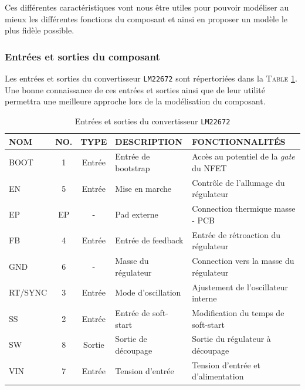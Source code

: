 			Ces différentes caractéristiques vont nous être utiles pour pouvoir 
			modéliser au mieux les différentes fonctions du composant et ainsi
			en proposer un modèle le plus fidèle possible.
		 
			\subsubsection{Entrées et sorties du composant}
			
			Les entrées et sorties du convertisseur \texttt{LM22672} sont répertoriées dans la
			\textsc{Table \ref{io_lm22672}}. 
			Une bonne connaissance de ces entrées et sorties ainsi que de leur 
			utilité permettra une meilleure approche lors de la modélisation 
			du composant.
			
			\begin{table}[h]
				\begin{center}
					\begin{tabular}{|l|c|c|l|l|}
					\hline
					\textbf{NOM}	& \textbf{NO.}	& \textbf{TYPE}	& \textbf{DESCRIPTION}	& \textbf{FONCTIONNALITÉS} \\
					\hline										
					BOOT			&	1			& 	Entrée		& 	Entrée de bootstrap	&	Accès au 
																								potentiel de la 
																								\textit{gate} du NFET	\\
					EN				&	5			&	Entrée		& 	Mise en marche		& 	Contrôle de
																								l'allumage du régulateur\\
					EP				& 	EP			&	-			&	Pad externe			& 	Connection thermique 
																								masse - PCB 			\\
					FB				&	4			&	Entrée		&	Entrée de feedback	&	Entrée de rétroaction
																								du régulateur			\\
					GND				&	6			&	-			&	Masse du régulateur	&	Connection vers la masse 
																								du régulateur			\\
					RT/SYNC			&	3			&	Entrée		&	Mode d'oscillation	&	Ajustement de
																								l'oscillateur interne	\\
					SS				&	2			&	Entrée		&	Entrée de soft-start&	Modification du temps
																								de soft-start			\\
					SW				&	8			&	Sortie		&	Sortie de découpage	&	Sortie du régulateur à
																								découpage				\\	
					VIN				&	7			&	Entrée		&	Tension d'entrée	&	Tension d'entrée et
																								d'alimentation			\\
					\hline
				\end{tabular}				
				\end{center}	
				\caption{Entrées et sorties du convertisseur \texttt{LM22672} \cite{LM22672}}
				\label{io_lm22672}
			\end{table}
			
